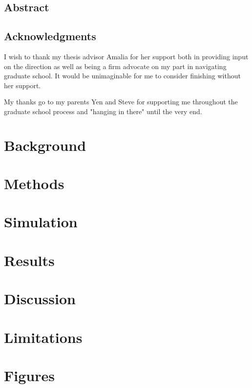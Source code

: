 

\frontmatter

\thetitlepage
\cleardoublepage
\setcounter{page}{1}

\section{Abstract}
\uwabstract
\cleardoublepage

\section{Acknowledgments}
I wish to thank my thesis advisor Amalia for her support both in providing input on the direction as well as being a firm advocate on my part in navigating graduate school. It would be unimaginable for me to consider finishing without her support.

My thanks go to my parents Yen and Steve for supporting me throughout the graduate school process and "hanging in there" until the very end. 

\clearpage

\tableofcontents\clearpage
\listoffigures\clearpage
\listoftables\clearpage

\mainmatter

\chapter{Background}

\chapter{Methods}

\chapter{Simulation}

\chapter{Results}

\chapter{Discussion}

\chapter{Limitations}

\chapter{Figures}





